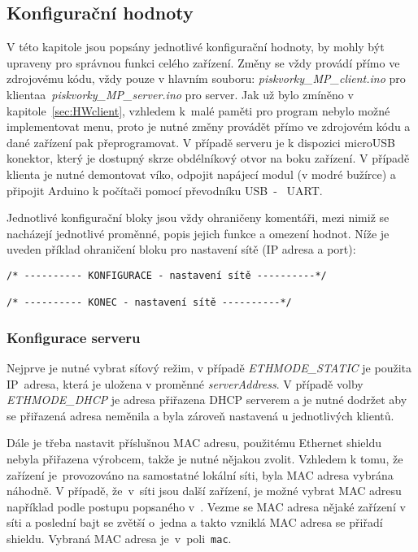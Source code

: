 
\subsection{Konfigurační hodnoty}
V této kapitole jsou popsány jednotlivé konfigurační hodnoty, by mohly být upraveny pro správnou funkci celého zařízení. Změny se vždy provádí přímo ve zdrojovému kódu, vždy pouze v hlavním souboru: \textit{piskvorky\_MP\_client.ino} pro klienta\linebreak a~\mbox{\textit{piskvorky\_MP\_server.ino}} pro server. Jak už bylo zmíněno v kapitole~\ref{sec:HWclient}, vzhledem k~malé paměti pro program nebylo možné implementovat menu, proto je nutné změny provádět přímo ve zdrojovém kódu a dané zařízení pak přeprogramovat. V případě serveru je k dispozici microUSB konektor, který je dostupný skrze obdélníkový otvor na boku zařízení. V případě klienta je nutné demontovat víko, odpojit napájecí modul (v modré bužírce) a připojit Arduino k počítači pomocí převodníku USB~-~ UART.

Jednotlivé konfigurační bloky jsou vždy ohraničeny komentáři, mezi nimiž se nacházejí jednotlivé proměnné, popis jejich funkce a omezení hodnot. Níže je uveden příklad ohraničení bloku pro nastavení sítě (IP adresa a port):
\begin{verbatim}
/* ---------- KONFIGURACE - nastavení sítě ----------*/

/* ---------- KONEC - nastavení sítě ----------*/
\end{verbatim}


\subsubsection{Konfigurace serveru}
\label{sec:server-nastaveni}
Nejprve je nutné vybrat síťový režim, v případě \textit{ETHMODE\_STATIC} je použita IP~adresa, která je uložena v proměnné \textit{serverAddress}. V případě volby \textit{ETHMODE\_DHCP} je adresa přiřazena DHCP serverem a je nutné dodržet aby se přiřazená adresa neměnila a byla zároveň nastavená u jednotlivých klientů.

Dále je třeba nastavit příslušnou MAC adresu, použitému Ethernet shieldu nebyla přiřazena výrobcem, takže je nutné nějakou zvolit. Vzhledem k tomu, že zařízení je~provozováno na samostatné lokální síti, byla MAC adresa vybrána náhodně. V případě, že~v~síti jsou další zařízení, je možné vybrat MAC adresu například podle postupu popsaného v~\cite{vyberMAC}. Vezme se MAC adresa nějaké zařízení v síti a poslední bajt se zvětší o~jedna a takto vzniklá MAC adresa se přiřadí shieldu.
Vybraná MAC adresa je~v~poli~\texttt{mac}.

